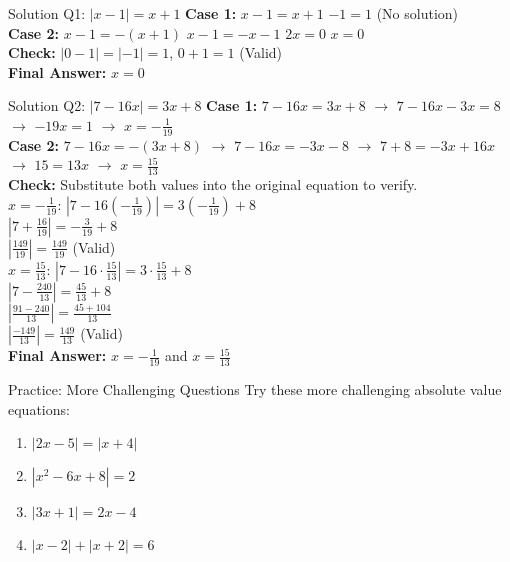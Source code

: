 \documentclass[aspectratio=169]{beamer}
\begin{document}
\begin{frame}{Solution Q1: $|x-1| = x+1$}
    \footnotesize
    \textbf{Case 1:} $x-1 = x+1$ \rightarrow $-1=1$ (No solution)\\
    \textbf{Case 2:} $x-1 = -(x+1)$ \rightarrow $x-1 = -x-1$ \rightarrow $2x=0$ \rightarrow $x=0$\\
    \textbf{Check:} $|0-1| = | -1 | = 1$, $0+1=1$ (Valid)\\
    \textbf{Final Answer:} $x=0$
\end{frame}

\begin{frame}{Solution Q2: $|7-16x| = 3x+8$}
    \footnotesize
    \textbf{Case 1:} $7-16x = 3x+8$ $\rightarrow$ $7-16x-3x=8$ $\rightarrow$ $-19x=1$ $\rightarrow$ $x=-\frac{1}{19}$\\
    \textbf{Case 2:} $7-16x = -(3x+8)$ $\rightarrow$ $7-16x=-3x-8$ $\rightarrow$ $7+8=-3x+16x$ $\rightarrow$ $15=13x$ $\rightarrow$ $x=\frac{15}{13}$\\
    \textbf{Check:} Substitute both values into the original equation to verify.\\
    $x=-\frac{1}{19}$: $|7-16(-\frac{1}{19})| = 3(-\frac{1}{19})+8$\\
    $|7+\frac{16}{19}| = -\frac{3}{19}+8$\\
    $|\frac{149}{19}| = \frac{149}{19}$ (Valid)\\
    $x=\frac{15}{13}$: $|7-16\cdot\frac{15}{13}| = 3\cdot\frac{15}{13}+8$\\
    $|7-\frac{240}{13}| = \frac{45}{13}+8$\\
    $|\frac{91-240}{13}| = \frac{45+104}{13}$\\
    $|\frac{-149}{13}| = \frac{149}{13}$ (Valid)\\
    \textbf{Final Answer:} $x=-\frac{1}{19}$ and $x=\frac{15}{13}$
\end{frame}

\begin{frame}{Practice: More Challenging Questions}
    \footnotesize
    Try these more challenging absolute value equations:
    \begin{enumerate}[label=Q\arabic*, start=7]
        \item $|2x-5| = |x+4|$
        \item $|x^2-6x+8| = 2$
        \item $|3x+1| = 2x-4$
        \item $|x-2| + |x+2| = 6$
    \end{enumerate}
\end{frame}
\end{document}
